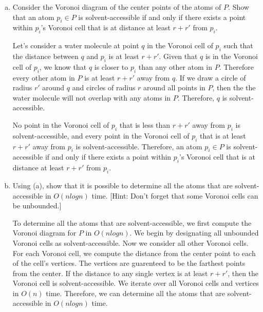 \documentclass[11pt]{article}
\begin{document}
\begin{enumerate}[(a)]\itemsep0pt
  \item
    Consider the Voronoi diagram of the center points of the atoms of \(P\). Show that an
    atom \(p_i \in P\) is solvent-accessible if and only if there exists a point within \(p_i\)'s Voronoi
    cell that is at distance at least \(r + r'\) from \(p_i\).
    
\begin{solution}
  Let's consider a water molecule at point \(q\) in the Voronoi cell of \(p_i\) such that the distance between \(q\) and \(p_i\) is at least \(r + r'\).
  Given that \(q\) is in the Voronoi cell of \(p_i\), we know that \(q\) is closer to \(p_i\) than any other atom in \(P\).
  Therefore every other atom in \(P\) is at least \(r + r'\) away from \(q\). If we draw a circle of radius \(r'\) around \(q\) and circles of radius \(r\) around all points in \(P\),
  then the the water molecule will not overlap with any atoms in \(P\). Therefore, \(q\) is solvent-accessible.

  No point in the Voronoi cell of \(p_i\) that is less than \(r + r'\) away from \(p_i\) is solvent-accessible, and every point in the Voronoi cell
  of \(p_i\) that is at least \(r + r'\) away from \(p_i\) is solvent-accessible. Therefore, an atom \(p_i \in P\) is solvent-accessible if and only if there exists a point within \(p_i\)'s Voronoi
  cell that is at distance at least \(r + r'\) from \(p_i\).
\end{solution}

  \item
    Using (a), show that it is possible to determine all the atoms that are solvent-accessible in \(O(n log n)\) time.
    [Hint: Don't forget that some Voronoi cells can be unbounded.]

\begin{solution}
  To determine all the atoms that are solvent-accessible, we first compute the Voronoi diagram for \(P\) in \(O(n log n)\).
  We begin by designating all unbounded Voronoi cells as solvent-accessible. Now we consider all other Voronoi cells. For each Voronoi cell,
  we compute the distance from the center point to each of the cell's vertices. The vertices are guarenteed to be the farthest points from the center.
  If the distance to any single vertex is at least \(r + r'\), then the Voronoi cell is solvent-accessible. We iterate over all Voronoi cells and vertices in \(O(n)\) time.
  Therefore, we can determine all the atoms that are solvent-accessible in \(O(n log n)\) time.
\end{solution}
\end{enumerate}
\end{document}
